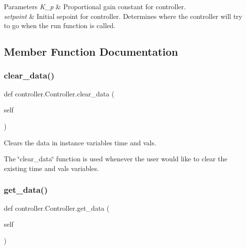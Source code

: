 \begin{DoxyParams}{Parameters}
{\em K\+\_\+p} & Proportional gain constant for controller.\\
\hline
{\em setpoint} & Initial sepoint for controller. Determines where the controller will try to go when the run function is called. \\
\hline
\end{DoxyParams}


\subsection{Member Function Documentation}
\mbox{\label{classcontroller_1_1_controller_a7e3a8cc2bca705811459c49ec7548f64}} 
\subsubsection{\texorpdfstring{clear\+\_\+data()}{clear\_data()}}
{\footnotesize\ttfamily def controller.\+Controller.\+clear\+\_\+data (\begin{DoxyParamCaption}\item[{}]{self }\end{DoxyParamCaption})}



Clears the data in instance variables time and vals. 

The \char`\"{}clear\+\_\+data\char`\"{} function is used whenever the user would like to clear the existing time and vals variables. \mbox{\label{classcontroller_1_1_controller_a035f659090efe04d8db8e9ad30a4d61e}} 
\subsubsection{\texorpdfstring{get\+\_\+data()}{get\_data()}}
{\footnotesize\ttfamily def controller.\+Controller.\+get\+\_\+data (\begin{DoxyParamCaption}\item[{}]{self }\end{DoxyParamCaption})}



